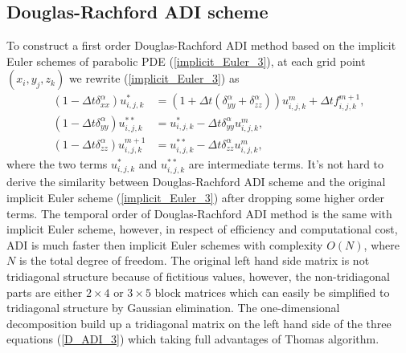 \documentclass[dissertation]{uathesis}
\begin{document}
\begin{body}
\begin{flushleft}
\subsection{Douglas-Rachford ADI scheme}
\hspace{1cm} To construct a first order Douglas-Rachford ADI method \cite{douglas1955numerical2, paeceman1955numerical} based on the implicit Euler schemes of parabolic PDE (\ref{implicit_Euler_3}), at each grid point $(x_i, y_j, z_k)$ we rewrite (\ref{implicit_Euler_3}) as
%
\begin{align} \label{D_ADI_3}
(1-\Delta t \delta^{\alpha}_{xx}) u^{*}_{i,j,k}   &= (1 + \Delta t (\delta^{\alpha}_{yy} + \delta^{\alpha}_{zz})) u^{m}_{i,j,k} + \Delta t f^{m+1}_{i,j,k}, \nonumber \\
(1-\Delta t \delta^{\alpha}_{yy}) u^{**}_{i,j,k}  &= u^{*}_{i,j,k} - \Delta t \delta^{\alpha}_{yy} u^{m}_{i,j,k},  \\
(1-\Delta t \delta^{\alpha}_{zz}) u^{m+1}_{i,j,k} &= u^{**}_{i,j,k} - \Delta t \delta^{\alpha}_{zz} u^{m}_{i,j,k}, \nonumber
\end{align}
%
where the two terms $u^{*}_{i,j,k}$ and $u^{**}_{i,j,k}$ are intermediate terms. It's not hard to derive the similarity between Douglas-Rachford ADI scheme and the original implicit Euler scheme (\ref{implicit_Euler_3}) after dropping some higher order terms. The temporal order of Douglas-Rachford ADI method is the same with implicit Euler scheme, however, in respect of efficiency and computational cost, ADI is much faster then implicit Euler schemes with complexity $O(N)$, where $N$ is the total degree of freedom. The original left hand side matrix is not tridiagonal structure because of fictitious values, however, the non-tridiagonal parts are either 
$2\times4$ or $3\times5$ block matrices which can easily be simplified to tridiagonal structure by Gaussian elimination. The one-dimensional decomposition build up a tridiagonal matrix on the left hand side of the three equations (\ref{D_ADI_3}) which taking full advantages of Thomas algorithm. 


\end{flushleft}
\end{body}
\end{document}
